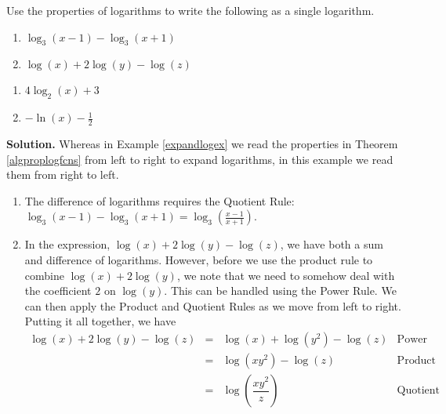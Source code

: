 \begin{ex}  \label{contractlogex} Use the properties of logarithms to write the following as a single logarithm.

\begin{multicols}{2}
\begin{enumerate}

\item  $\log_{3}(x-1) - \log_{3}(x+1)$

\item  $\log(x) + 2\log(y) - \log(z)$

\setcounter{HW}{\value{enumi}}
\end{enumerate}
\end{multicols}

\begin{multicols}{2}
\begin{enumerate}
\setcounter{enumi}{\value{HW}}

\item  $4\log_{2}(x) + 3$

\item  $-\ln(x) - \frac{1}{2}$


\end{enumerate}
\end{multicols}

{\bf Solution.} Whereas in Example \ref{expandlogex} we read the properties in Theorem \ref{algproplogfcns} from left to right to expand logarithms, in this example we read them from right to left.

\begin{enumerate}

\item The difference of logarithms requires the Quotient Rule: $\log_{3}(x-1) - \log_{3}(x+1) = \log_{3}\left(\frac{x-1}{x+1}\right)$.

\item  In the expression, $\log(x) + 2\log(y) - \log(z)$, we have both a sum and difference of logarithms.  However, before we use the product rule to combine $\log(x) + 2\log(y)$, we note that we need to somehow deal with the coefficient $2$ on $\log(y)$.  This can be handled using the Power Rule. We can then apply the Product and Quotient Rules as we move from left to right. Putting it all together, we have
\setlength{\extrarowheight}{6pt}
\[ \begin{array}{rclr}

\log(x) + 2\log(y) - \log(z) & = & \log(x) + \log\left(y^2\right) - \log(z) & \mbox{Power Rule} \\ [6pt]
                             & = & \log\left(xy^2\right) - \log(z) & \mbox{Product Rule} \\ [10pt]
                             & = & \log\left( \dfrac{xy^2}{z}\right) & \mbox{Quotient Rule} \\
                             

\end{array}\]
\end{enumerate}
\end{ex}
